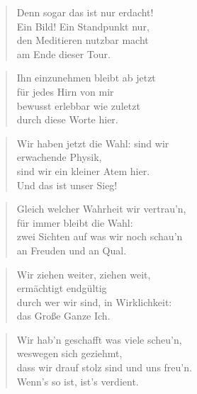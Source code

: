 \documentclass[10pt,a4paper]{article}
\begin{document}
\begin{paracol}{2}
\begin{verse}
Denn sogar das ist nur erdacht! \\
Ein Bild! Ein Standpunkt nur, \\
den Meditieren nutzbar macht \\
am Ende dieser Tour. \\
\end{verse}

\begin{verse}
Ihn einzunehmen bleibt ab jetzt \\
für jedes Hirn von mir \\
bewusst erlebbar wie zuletzt \\
durch diese Worte hier. \\
\end{verse}

\begin{verse}
Wir haben jetzt die Wahl: sind wir \\
erwachende Physik, \\
sind wir ein kleiner Atem hier. \\
Und das ist unser Sieg! \\
\end{verse}

\begin{verse}
Gleich welcher Wahrheit wir vertrau’n, \\
für immer bleibt die Wahl: \\
zwei Sichten auf was wir noch schau’n \\
an Freuden und an Qual. \\
\end{verse}

\begin{verse}
Wir ziehen weiter, ziehen weit, \\
ermächtigt endgültig \\
durch wer wir sind, in Wirklichkeit: \\
das Große Ganze Ich. \\
\end{verse}

\begin{verse}
Wir hab’n geschafft was viele scheu’n, \\
weswegen sich geziehmt, \\
dass wir drauf stolz sind und uns freu’n. \\
Wenn’s so ist, ist’s verdient. \\
\end{verse}


\end{paracol}
\end{document}
